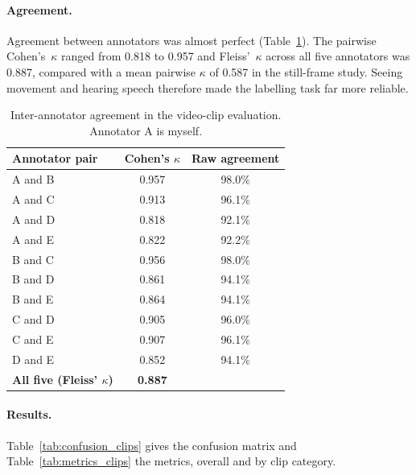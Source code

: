 \paragraph{Agreement.}
Agreement between annotators was almost perfect (Table~\ref{tab:clip_kappa}). The
pairwise Cohen's~$\kappa$ ranged from 0.818 to 0.957 and Fleiss'~$\kappa$ across all
five annotators was 0.887, compared with a mean pairwise $\kappa$ of 0.587 in the
still-frame study. Seeing movement and hearing speech therefore made the labelling
task far more reliable.

\begin{table}[htbp]
\begin{singlespace}
\centering
\caption{Inter-annotator agreement in the video-clip evaluation. Annotator A is
myself.}
\label{tab:clip_kappa}
\renewcommand{\arraystretch}{1.3}
\begin{tabular}{@{}lcc@{}}
\toprule
\textbf{Annotator pair} & \textbf{Cohen's $\kappa$} & \textbf{Raw agreement} \\
\midrule
A and B & 0.957 & 98.0\% \\
A and C & 0.913 & 96.1\% \\
A and D & 0.818 & 92.1\% \\
A and E & 0.822 & 92.2\% \\
B and C & 0.956 & 98.0\% \\
B and D & 0.861 & 94.1\% \\
B and E & 0.864 & 94.1\% \\
C and D & 0.905 & 96.0\% \\
C and E & 0.907 & 96.1\% \\
D and E & 0.852 & 94.1\% \\
\midrule
\textbf{All five (Fleiss' $\kappa$)} & \textbf{0.887} & \\
\bottomrule
\end{tabular}
\end{singlespace}
\end{table}

\paragraph{Results.}
Table~\ref{tab:confusion_clips} gives the confusion matrix and
Table~\ref{tab:metrics_clips} the metrics, overall and by clip category.

